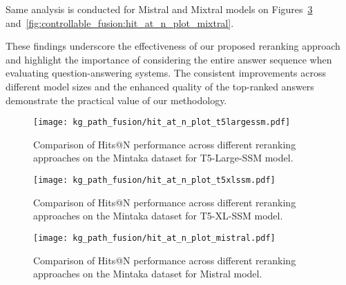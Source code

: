 Same analysis is conducted for Mistral and Mixtral models on Figures~\ref{fig:controllable_fusion:hit_at_n_plot_mistral} and~\ref{fig:controllable_fusion:hit_at_n_plot_mixtral}.

These findings underscore the effectiveness of our proposed reranking approach and highlight the importance of considering the entire answer sequence when evaluating question-answering systems. The consistent improvements across different model sizes and the enhanced quality of the top-ranked answers demonstrate the practical value of our methodology.


\begin{figure}[htbp]
    \centering
    \texttt{[image: kg\_path\_fusion/hit\_at\_n\_plot\_t5largessm.pdf]}
    \caption{Comparison of Hits@N performance across different reranking approaches on the Mintaka dataset for T5-Large-SSM model.}
    \label{fig:controllable_fusion:hit_at_n_plot_t5largessm}
 \end{figure}
 
 \begin{figure}[htbp]
    \centering
    \texttt{[image: kg\_path\_fusion/hit\_at\_n\_plot\_t5xlssm.pdf]}
    \caption{Comparison of Hits@N performance across different reranking approaches on the Mintaka dataset for T5-XL-SSM model.}
    \label{fig:controllable_fusion:hit_at_n_plot_t5xlssm}
 \end{figure}
 
 \begin{figure}[htbp]
    \centering
    \texttt{[image: kg\_path\_fusion/hit\_at\_n\_plot\_mistral.pdf]}
    \caption{Comparison of Hits@N performance across different reranking approaches on the Mintaka dataset for Mistral model.}
    \label{fig:controllable_fusion:hit_at_n_plot_mistral}
 \end{figure}

